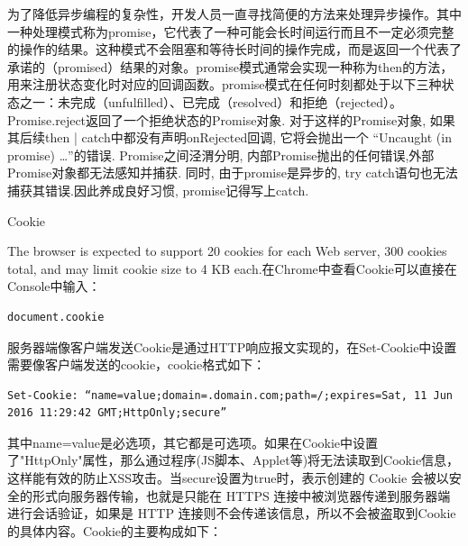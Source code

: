 \documentclass[12pt]{book}
\makeatletter
\numberwithin{dummy}{section}
\theoremstyle{ocrenumbox}
\theoremstyle{blacknumex}
\theoremstyle{blacknumbox}
\theoremstyle{ocrenum}
\renewcommand{\section}{\@startsection{section}{1}{\z@}
	{-4ex \@plus -1ex \@minus -.4ex}
	{1ex \@plus.2ex }
	{\normalfont\large\sffamily\bfseries}}
\makeatother
\begin{document}
为了降低异步编程的复杂性，开发人员一直寻找简便的方法来处理异步操作。其中一种处理模式称为promise，它代表了一种可能会长时间运行而且不一定必须完整的操作的结果。这种模式不会阻塞和等待长时间的操作完成，而是返回一个代表了承诺的（promised）结果的对象。promise模式通常会实现一种称为then的方法，用来注册状态变化时对应的回调函数。promise模式在任何时刻都处于以下三种状态之一：未完成（unfulfilled）、已完成（resolved）和拒绝（rejected）。Promise.reject返回了一个拒绝状态的Promise对象. 对于这样的Promise对象, 如果其后续then | catch中都没有声明onRejected回调, 它将会抛出一个 “Uncaught (in promise) …”的错误. Promise之间泾渭分明, 内部Promise抛出的任何错误,外部Promise对象都无法感知并捕获. 同时, 由于promise是异步的, try catch语句也无法捕获其错误.因此养成良好习惯, promise记得写上catch.

\section{Cookie}

The browser is expected to support 20 cookies for each Web server, 300 cookies total, and may limit cookie size to 4 KB each.在Chrome中查看Cookie可以直接在Console中输入：

\begin{lstlisting}[language=Bash]
document.cookie
\end{lstlisting}

服务器端像客户端发送Cookie是通过HTTP响应报文实现的，在Set-Cookie中设置需要像客户端发送的cookie，cookie格式如下：

\begin{lstlisting}
Set-Cookie: “name=value;domain=.domain.com;path=/;expires=Sat, 11 Jun 2016 11:29:42 GMT;HttpOnly;secure”
\end{lstlisting}

其中name=value是必选项，其它都是可选项。如果在Cookie中设置了"HttpOnly"属性，那么通过程序(JS脚本、Applet等)将无法读取到Cookie信息，这样能有效的防止XSS攻击。当secure设置为true时，表示创建的 Cookie 会被以安全的形式向服务器传输，也就是只能在 HTTPS 连接中被浏览器传递到服务器端进行会话验证，如果是 HTTP 连接则不会传递该信息，所以不会被盗取到Cookie 的具体内容。Cookie的主要构成如下：
\end{document}

